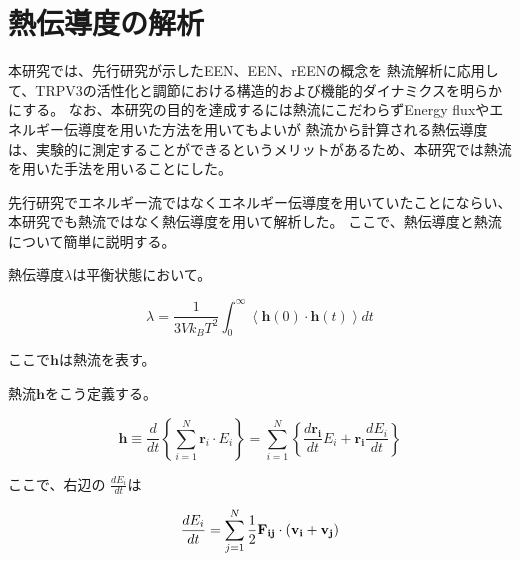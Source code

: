 

\section{熱伝導度の解析}
本研究では、先行研究が示したEEN、\Delta EEN、r\Delta EENの概念\autocite{ishikura2015,ota_energy_2019,poudel_energy_2022}を
熱流解析に応用して、TRPV3の活性化と調節における構造的および機能的ダイナミクスを明らかにする。
なお、本研究の目的を達成するには熱流にこだわらずEnergy fluxやエネルギー伝導度を用いた方法を用いてもよいが
熱流から計算される熱伝導度は、実験的に測定することができるというメリットがあるため、本研究では熱流を用いた手法を用いることにした。

先行研究でエネルギー流ではなくエネルギー伝導度を用いていたことにならい、本研究でも熱流ではなく熱伝導度を用いて解析した。
ここで、熱伝導度と熱流について簡単に説明する。

熱伝導度$\lambda$は平衡状態において。

\begin{equation}
  \label{eq:thermal_conductivity}
  \lambda = \frac{1}{3Vk_B T^2} \int_{0}^{\infty} \left\langle
    \bm{h}(0) \cdot \bm{h}(t)
  \right\rangle dt
\end{equation}

ここで$\mathbf{h}$は熱流を表す。\autocite{mcquarrie_statistical_2000}

熱流$\mathbf{h}$をこう定義する。

\begin{equation}
  \label{eq:heat_flow}
  \bm{h} \equiv \frac{d}{dt} \left\{
    \sum_{i=1}^{N} \bm{r}_i \cdot E_i
  \right\} = \sum_{i=1}^{N} \left\{
    \frac{d\bm{r_i}}{dt}E_i + \bm{r_i}\frac{dE_i}{dt}
  \right\}
\end{equation}

ここで、右辺の $\frac{dE_i}{dt}$は

\begin{equation}
  \label{time_derivative_of_energy}
  \frac{dE_i}{dt} = \sum_{j=1}^{N} \frac{1}{2} \bf{F}_{ij} \cdot (\bf{v}_i + \bf{v}_j)
\end{equation}

